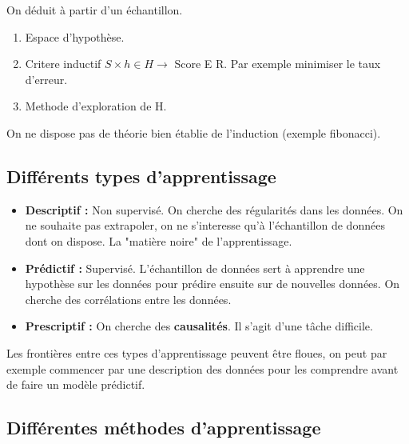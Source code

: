 \documentclass{article}
\begin{document}
On déduit à partir d'un échantillon.

\begin{enumerate}
\item Espace d'hypothèse.
\item Critere inductif $ S \times h \in H \rightarrow $ Score E R. Par exemple minimiser le taux d'erreur.
\item Methode d'exploration de H.
\end{enumerate}

On ne dispose pas de théorie bien établie de l'induction (exemple fibonacci).

\subsection{Différents types d'apprentissage}
\begin{itemize}
\item \textbf{Descriptif :} Non supervisé. On cherche des régularités dans les données. On ne souhaite pas extrapoler, on ne s'interesse qu'à l'échantillon de données dont on dispose. La "matière noire" de l'apprentissage.
\item \textbf{Prédictif :} Supervisé. L'échantillon de données sert à apprendre une hypothèse sur les données pour prédire ensuite sur de nouvelles données. On cherche des corrélations entre les données.
\item \textbf{Prescriptif :} On cherche des \textbf{causalités}. Il s'agit d'une tâche difficile.
\end{itemize}

Les frontières entre ces types d'apprentissage peuvent être floues, on peut par exemple commencer par une description des données pour les comprendre avant de faire un modèle prédictif.

\subsection{Différentes méthodes d'apprentissage}
\end{document}
